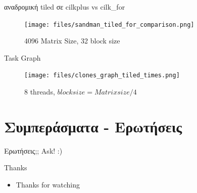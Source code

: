 \documentclass{beamer}
\begin{document}
\begin{frame}
    \begin{block}{αναδρομική tiled σε cilkplus vs cilk\_for}
        \begin{figure}[H]
            \centering
            \texttt{[image: files/sandman\_tiled\_for\_comparison.png]}
            \caption{4096 Matrix Size, 32 block size}
        \end{figure}
    \end{block}
\end{frame}

\begin{frame}
    \begin{block}{Task Graph}
        \begin{figure}[H]
            \centering
            \texttt{[image: files/clones\_graph\_tiled\_times.png]}
            \caption{8 threads, $block size = Matrix size /4$}
        \end{figure}
    \end{block}
\end{frame}

\section{Συμπεράσματα - Ερωτήσεις}

\begin{frame}{Ερωτήσεις;;}
    Ask! :)
\end{frame}

\begin{frame}[fragile]{Thanks}
    \begin{itemize}
        \item Thanks for watching
    \end{itemize}
\end{frame}
\end{document}
